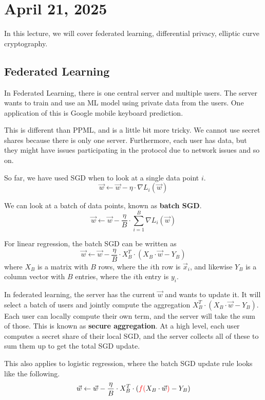 \section{April 21, 2025}
\label{20250421}

In this lecture, we will cover federated learning, differential privacy, elliptic curve cryptography.

\subsection{Federated Learning}

In Federated Learning, there is one central server and multiple users. The server wants to train and use an ML model using private data from the users. One application of this is Google mobile keyboard prediction.

This is different than PPML, and is a little bit more tricky. We cannot use secret shares because there is only one server. Furthermore, each user has data, but they might have issues participating in the protocol due to network issues and so on.

So far, we have used SGD when to look at a single data point $i$. 
$$\vec{w} \gets \vec{w} - \eta \cdot \nabla L_i(\vec{w})$$

We can look at a batch of data points, known as \textbf{batch SGD}.
$$\vec{w} \gets \vec{w} - \frac{\eta}{B} \cdot \sum_{i = 1}^B\nabla L_i(\vec{w})$$

For linear regression, the batch SGD can be written as
$$\vec{w} \gets \vec{w} - \frac{\eta}{B} \cdot X_B^T \cdot (X_B \cdot \vec{w} - Y_B)$$
where $X_B$ is a matrix with $B$ rows, where the $i$th row is $\vec{x}_i$, and likewise $Y_B$ is a column vector with $B$ entries, where the $i$th entry is $y_i$.

In federated learning, the server has the current $\vec{w}$ and wants to update it. It will select a batch of users and jointly compute the aggregation $X_B^T \cdot (X_B \cdot \vec{w} - Y_B)$. Each user can locally compute their own term, and the server will take the sum of those. This is known as \textbf{secure aggregation}. At a high level, each user computes a secret share of their local SGD, and the server collects all of these to sum them up to get the total SGD update.

This also applies to logistic regression, where the batch SGD update rule looks like the following.
$$\vec{w} \gets \vec{w} - \frac{\eta}{B} \cdot X_B^T \cdot ({\color{red}f(}X_B \cdot \vec{w}{\color{red})} - Y_B)$$

